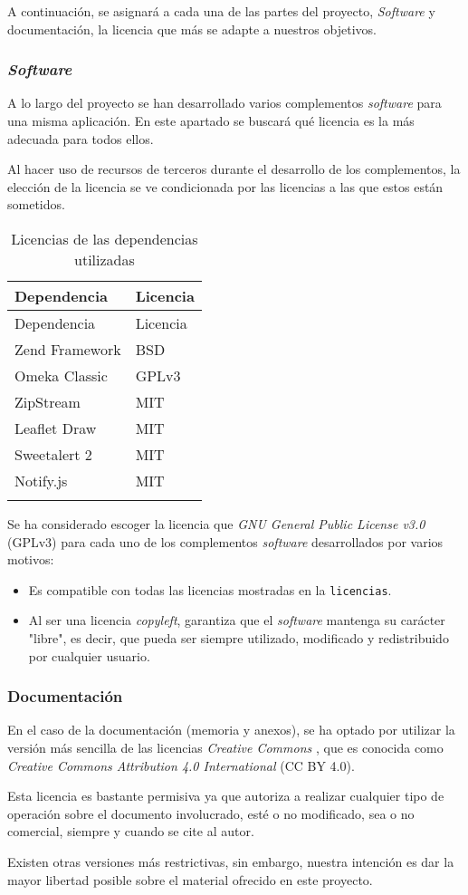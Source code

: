 A continuación, se asignará a cada una de las partes del proyecto,
\emph{Software} y documentación, la licencia que más se adapte a nuestros
objetivos.

\subsubsection{\emph{Software}}

A lo largo del proyecto se han desarrollado varios complementos
\emph{software} para una misma aplicación. En este apartado se buscará
qué licencia es la más adecuada para todos ellos.

Al hacer uso de recursos de terceros durante el desarrollo de los
complementos, la elección de la licencia se ve condicionada por las
licencias a las que estos están sometidos.

\begin{longtable}[]{@{}ll@{}}
\toprule
Dependencia & Licencia\tabularnewline
\midrule
\endfirsthead
\toprule
Dependencia & Licencia\tabularnewline
\midrule
\endhead
Zend Framework & BSD\tabularnewline
Omeka Classic & GPLv3\tabularnewline
ZipStream & MIT\tabularnewline
Leaflet Draw & MIT\tabularnewline
Sweetalert 2 & MIT\tabularnewline
Notify.js & MIT\tabularnewline
\bottomrule
\caption{Licencias de las dependencias utilizadas}\tabularnewline
\end{longtable}

Se ha considerado escoger la licencia que \emph{GNU General Public
License v3.0} \cite{gnu:web} (GPLv3) para cada uno de los complementos \emph{software}
desarrollados por varios motivos:

\begin{itemize}
\tightlist
\item
  Es compatible con todas las licencias mostradas en la
  \texttt{licencias}.
\item
  Al ser una licencia \emph{copyleft}, garantiza que el \emph{software}
  mantenga su carácter "libre", es decir, que pueda ser siempre
  utilizado, modificado y redistribuido por cualquier usuario.
\end{itemize}


\subsubsection{Documentación}

En el caso de la documentación (memoria y anexos), se ha optado por
utilizar la versión más sencilla de las licencias \emph{Creative
Commons} \cite{weboff:cc},
que es conocida como \emph{Creative Commons Attribution 4.0 International}
(CC BY 4.0).

Esta licencia es bastante permisiva ya que autoriza a realizar cualquier
tipo de operación sobre el documento involucrado, esté o no modificado,
sea o no comercial, siempre y cuando se cite al autor.

Existen otras versiones más restrictivas, sin embargo, nuestra intención
es dar la mayor libertad posible sobre el material ofrecido en este
proyecto.
